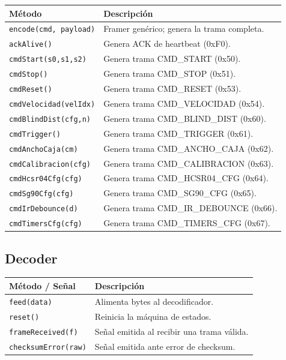 \documentclass[12pt,a4paper]{report}
\begin{document}
\begin{tabular}{lp{8cm}}
  \toprule
  \textbf{Método} & \textbf{Descripción} \\
  \midrule
  \texttt{encode(cmd, payload)} & Framer genérico; genera la trama completa. \\
  \texttt{ackAlive()} & Genera ACK de heartbeat (0xF0). \\
  \texttt{cmdStart(s0,s1,s2)} & Genera trama CMD\_START (0x50). \\
  \texttt{cmdStop()} & Genera trama CMD\_STOP (0x51). \\
  \texttt{cmdReset()} & Genera trama CMD\_RESET (0x53). \\
  \texttt{cmdVelocidad(velIdx)} & Genera trama CMD\_VELOCIDAD (0x54). \\
  \texttt{cmdBlindDist(cfg,n)} & Genera trama CMD\_BLIND\_DIST (0x60). \\
  \texttt{cmdTrigger()} & Genera trama CMD\_TRIGGER (0x61). \\
  \texttt{cmdAnchoCaja(cm)} & Genera trama CMD\_ANCHO\_CAJA (0x62). \\
  \texttt{cmdCalibracion(cfg)} & Genera trama CMD\_CALIBRACION (0x63). \\
  \texttt{cmdHcsr04Cfg(cfg)} & Genera trama CMD\_HCSR04\_CFG (0x64). \\
  \texttt{cmdSg90Cfg(cfg)} & Genera trama CMD\_SG90\_CFG (0x65). \\
  \texttt{cmdIrDebounce(d)} & Genera trama CMD\_IR\_DEBOUNCE (0x66). \\
  \texttt{cmdTimersCfg(cfg)} & Genera trama CMD\_TIMERS\_CFG (0x67). \\
  \bottomrule
\end{tabular}

\subsection{Decoder}

\begin{tabular}{lp{8cm}}
  \toprule
  \textbf{Método / Señal} & \textbf{Descripción} \\
  \midrule
  \texttt{feed(data)} & Alimenta bytes al decodificador. \\
  \texttt{reset()} & Reinicia la máquina de estados. \\
  \texttt{frameReceived(f)} & Señal emitida al recibir una trama válida. \\
  \texttt{checksumError(raw)} & Señal emitida ante error de checksum. \\
  \bottomrule
\end{tabular}
\end{document}

